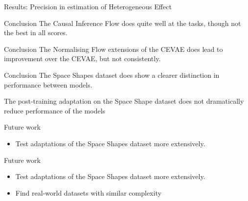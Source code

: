 \documentclass[dvipsnames, aspectratio=169]{beamer}
\begin{document}
\begin{frame}{Results: Precision in estimation of Heterogeneous Effect}
\begin{figure}
            \label{fig:PEHE}
            \end{figure}
	\end{frame}
	
	\begin{frame}{Conclusion}
	    The Causal Inference Flow does quite well at the tasks, though not the best in all scores.
	\end{frame}
	\begin{frame}{Conclusion}
	    The Normalising Flow extensions of the CEVAE does lead to improvement over the CEVAE, but not consistently.
	\end{frame}
	\begin{frame}{Conclusion}
	    The Space Shapes dataset does show a clearer distinction in performance between models.
	    
	    The post-training adaptation on the Space Shape dataset does not dramatically reduce performance of the models
	\end{frame}
	\begin{frame}{Future work}
	    \begin{itemize}
	        \item Test adaptations of the Space Shapes dataset more extensively.
	    \end{itemize}
	\end{frame}
		\begin{frame}{Future work}
	    \begin{itemize}
	        \item Test adaptations of the Space Shapes dataset more extensively.
	        \item Find real-world datasets with similar complexity
	    \end{itemize}
	\end{frame}
	
\end{document}

